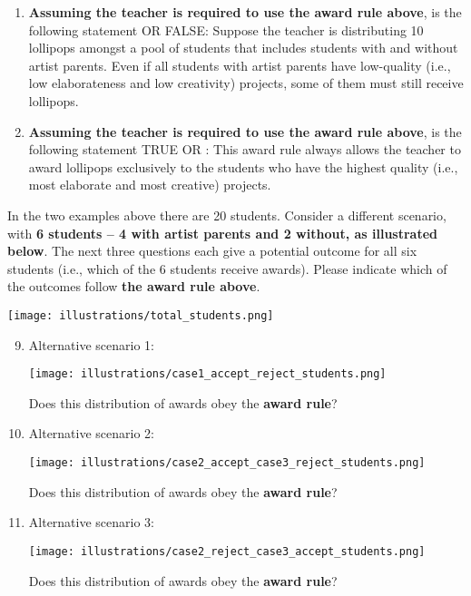 \documentclass{article}
\newcommand{\correct}[1]{{\color{red}{#1}}}
\newcommand{\correct}[1]{{\color{red}{#1}}}
\begin{document}
\begin{enumerate}
    \item \textbf{Assuming the teacher is required to use the award rule above}, is the following statement \correct{TRUE} OR FALSE: Suppose the teacher is distributing 10 lollipops amongst a pool of students that includes students with and without artist parents. Even if all students with artist parents have low-quality (i.e., low elaborateness and low creativity) projects, some of them must still receive lollipops.
    \item \textbf{Assuming the teacher is required to use the award rule above}, is the following statement TRUE OR \correct{FALSE}: This award rule always allows the teacher to award lollipops exclusively to the students who have the highest quality (i.e., most elaborate and most creative) projects.
\end{enumerate}

In the two examples above there are 20 students. Consider a different scenario, with \textbf{6 students -- 4 with artist parents and 2 without, as illustrated below}. The next three questions each give a potential outcome for all six students (i.e., which of the 6 students receive awards). Please indicate which of the outcomes follow \textbf{the award rule above}.

\vspace{10pt}
\texttt{[image: illustrations/total\_students.png]}

\begin{enumerate}
    \setcounter{enumi}{8}
    \item Alternative scenario 1:
    
    \vspace{10pt}
    \texttt{[image: illustrations/case1\_accept\_reject\_students.png]}
    
    Does this distribution of awards obey the \textbf{award rule}? \correct{Yes}
    \item Alternative scenario 2:
    
    \vspace{10pt}
    \texttt{[image: illustrations/case2\_accept\_case3\_reject\_students.png]}
    
    Does this distribution of awards obey the \textbf{award rule}? \correct{No}
    
    \item Alternative scenario 3:
    
    \vspace{10pt}
    \texttt{[image: illustrations/case2\_reject\_case3\_accept\_students.png]}
    
    Does this distribution of awards obey the \textbf{award rule}? \correct{No}
\end{enumerate}
\end{document}
